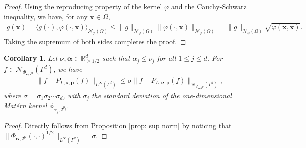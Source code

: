 \documentclass[pdflatex,sn-mathphys-num]{sn-jnl}%
\theoremstyle{thmstyleone}%
\newtheorem{corollary}{Corollary}
\theoremstyle{thmstyletwo}%
\theoremstyle{thmstylethree}%
\begin{document}
\begin{proof}
    Using the reproducing property of the kernel \(\varphi\) and the Cauchy-Schwarz inequality, we have, for any \(\mathbf{x}\in\Omega\),
    \begin{align}
        g(\mathbf{x})=\langle g(\cdot),\varphi(\cdot,\mathbf{x})\rangle_{\mathcal{N}_{\varphi}(\Omega)}\leq\|g\|_{\mathcal{N}_{\varphi}(\Omega)}\|\varphi(\cdot,\mathbf{x})\|_{\mathcal{N}_\varphi(\Omega)}=\|g\|_{\mathcal{N}_{\varphi}(\Omega)}\sqrt{\varphi(\mathbf{x},\mathbf{x})}.\nonumber
    \end{align}
    Taking the supremum of both sides completes the proof.
\end{proof}

\begin{corollary}\label{corr: sup norm} Let \(\boldsymbol{\nu},\boldsymbol{\alpha}\in\mathbb{R}^d_{\geq1/2}\) such that \(\alpha_j\leq\nu_j\) for all \(1\leq j \leq d\). For \(f\in\mathcal{N}_{\Phi_{\boldsymbol{\nu},2^{\mathbf{p}}}}(\Gamma^d)\), we have 
    \begin{align}
        \|f-P_{L,\boldsymbol{\nu},\mathbf{p}}(f)\|_{L^\infty(\Gamma^d)}\leq\sigma\|f-P_{L,\boldsymbol{\nu},\mathbf{p}}(f)\|_{\mathcal{N}_{\Phi_{\boldsymbol{\alpha},2^{\mathbf{p}}}}(\Gamma^d)},\label{eq: var prop 2}
    \end{align}
    where \(\sigma=\sigma_1\sigma_2\cdots\sigma_d\), with \(\sigma_j\) the standard deviation of the one-dimensional Mat\'ern kernel \(\phi_{\alpha_j,2^{p_j}}\).
\end{corollary}
\begin{proof}
    Directly follows from Proposition \ref{prop: sup norm} by noticing that \(\|\Phi_{\boldsymbol{\alpha},2^{\mathbf{p}}}(\cdot,\cdot)^{1/2}\|_{L^\infty(\Gamma^d)}=\sigma\).
\end{proof}
\end{document}
